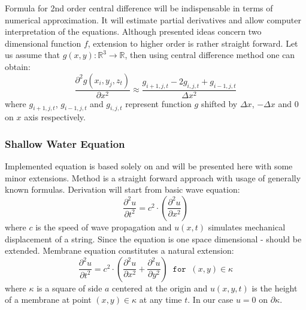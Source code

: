 \documentclass{report}
\begin{document}
Formula for 2nd order central difference will be indispensable in terms of numerical approximation. It will estimate partial derivatives and allow computer interpretation of the equations. Although presented ideas concern two dimensional function $f$, extension to higher order is rather straight forward. Let us assume that $g(x,y): \mathbb{R}^{3} \rightarrow \mathbb{R}$, then using central difference method one can obtain:
\begin{equation*}
\frac{\partial^2g(x_i,y_j,z_t)}{\partial x^2} \approx \frac{g_{i+1 , j, t} - 2 g_{i , j, t} + g_{i-1 , j, t}}{\Delta x ^ 2}
\end{equation*}
where $g_{i+1 , j, t}$, $g_{i-1 , j, t}$ and $g_{i , j, t}$ represent function $g$ shifted by $\Delta x$, $-\Delta x$ and $0$ on $x$ axis respectively.

\subsubsection{Shallow Water Equation}

Implemented equation is based solely on \cite{gomez} and will be presented here with some minor extensions. Method is a straight forward approach with usage of generally known formulas. Derivation will start from basic wave equation:
\begin{equation}
\frac{\partial^2u}{\partial t^2} = c^{2} \cdot (\frac{\partial^2u}{\partial x^2})
\end{equation}
where $c$ is the speed of wave propagation and $u(x,t)$ simulates mechanical displacement of a string. Since the equation is one space dimensional - should be extended. Membrane equation constitutes a natural extension:
\begin{equation} \label{eq:membran_eq}
\frac{\partial^2u}{\partial t^2} = c^{2} \cdot (\frac{\partial^2u}{\partial x^2} + \frac{\partial^2u}{\partial y^2}) \; \; \texttt{for} \; \; (x,y) \in \kappa
\end{equation}
where $\kappa$ is a square of side $a$ centered at the origin and  $u(x,y,t)$ is the height of a membrane at point $(x,y) \in \kappa$ at any time $t$. In our case $u = 0$ on $\partial \kappa$. 
\end{document}
